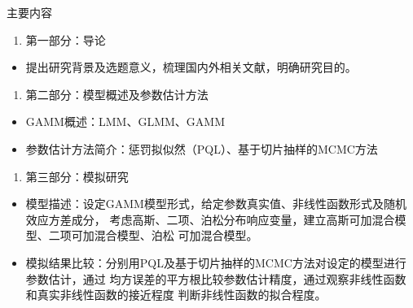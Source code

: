 \documentclass[ignorenonframetext,11pt,xcolor=dvipsnames,aspectratio=1610,hyperref={bookmarksdepth=4}]{beamer}
\providecommand{\tightlist}{%
  \setlength{\itemsep}{0pt}\setlength{\parskip}{0pt}}
\begin{document}
\begin{frame}{主要内容}

\begin{enumerate}
\def\labelenumi{\arabic{enumi}.}
\tightlist
\item
  第一部分：导论
\end{enumerate}

\begin{itemize}
\tightlist
\item
  提出研究背景及选题意义，梳理国内外相关文献，明确研究目的。
\end{itemize}

\begin{enumerate}
\def\labelenumi{\arabic{enumi}.}
\setcounter{enumi}{1}
\tightlist
\item
  第二部分：模型概述及参数估计方法
\end{enumerate}

\begin{itemize}
\tightlist
\item
  GAMM概述：LMM、GLMM、GAMM
\item
  参数估计方法简介：惩罚拟似然（PQL）、基于切片抽样的MCMC方法
\end{itemize}

\begin{enumerate}
\def\labelenumi{\arabic{enumi}.}
\setcounter{enumi}{2}
\tightlist
\item
  第三部分：模拟研究
\end{enumerate}

\begin{itemize}
\tightlist
\item
  模型描述：设定GAMM模型形式，给定参数真实值、非线性函数形式及随机效应方差成分，
  考虑高斯、二项、泊松分布响应变量，建立高斯可加混合模型、二项可加混合模型、泊松
  可加混合模型。
\item
  模拟结果比较：分别用PQL及基于切片抽样的MCMC方法对设定的模型进行参数估计，通过
  均方误差的平方根比较参数估计精度，通过观察非线性函数和真实非线性函数的接近程度
  判断非线性函数的拟合程度。
\end{itemize}

\end{frame}
\end{document}

